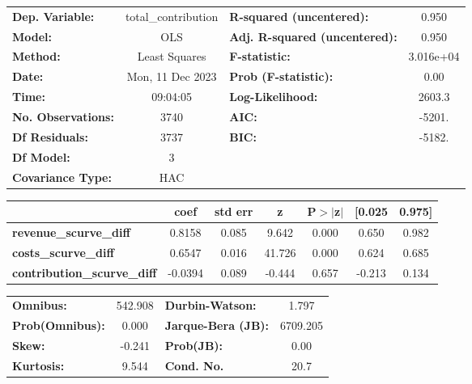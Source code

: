 \begin{center}
\begin{tabular}{lclc}
\toprule
\textbf{Dep. Variable:}             & total\_contribution & \textbf{  R-squared (uncentered):}      &     0.950   \\
\textbf{Model:}                     &         OLS         & \textbf{  Adj. R-squared (uncentered):} &     0.950   \\
\textbf{Method:}                    &    Least Squares    & \textbf{  F-statistic:       }          & 3.016e+04   \\
\textbf{Date:}                      &   Mon, 11 Dec 2023  & \textbf{  Prob (F-statistic):}          &     0.00    \\
\textbf{Time:}                      &       09:04:05      & \textbf{  Log-Likelihood:    }          &    2603.3   \\
\textbf{No. Observations:}          &          3740       & \textbf{  AIC:               }          &    -5201.   \\
\textbf{Df Residuals:}              &          3737       & \textbf{  BIC:               }          &    -5182.   \\
\textbf{Df Model:}                  &             3       & \textbf{                     }          &             \\
\textbf{Covariance Type:}           &         HAC         & \textbf{                     }          &             \\
\bottomrule
\end{tabular}
\begin{tabular}{lcccccc}
                                    & \textbf{coef} & \textbf{std err} & \textbf{z} & \textbf{P$> |$z$|$} & \textbf{[0.025} & \textbf{0.975]}  \\
\midrule
\textbf{revenue\_scurve\_diff}      &       0.8158  &        0.085     &     9.642  &         0.000        &        0.650    &        0.982     \\
\textbf{costs\_scurve\_diff}        &       0.6547  &        0.016     &    41.726  &         0.000        &        0.624    &        0.685     \\
\textbf{contribution\_scurve\_diff} &      -0.0394  &        0.089     &    -0.444  &         0.657        &       -0.213    &        0.134     \\
\bottomrule
\end{tabular}
\begin{tabular}{lclc}
\textbf{Omnibus:}       & 542.908 & \textbf{  Durbin-Watson:     } &    1.797  \\
\textbf{Prob(Omnibus):} &   0.000 & \textbf{  Jarque-Bera (JB):  } & 6709.205  \\
\textbf{Skew:}          &  -0.241 & \textbf{  Prob(JB):          } &     0.00  \\
\textbf{Kurtosis:}      &   9.544 & \textbf{  Cond. No.          } &     20.7  \\
\bottomrule
\end{tabular}
\end{center}